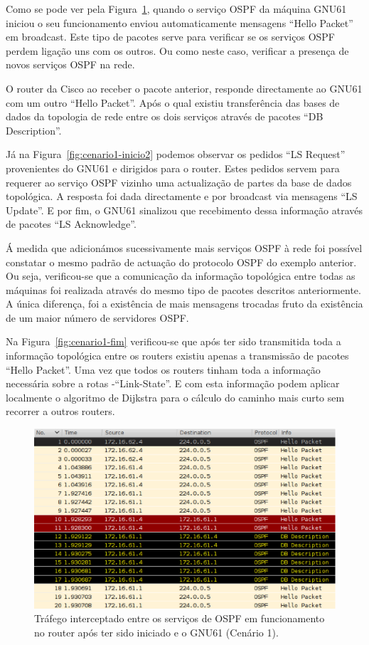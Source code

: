\documentclass[a4paper,12pt]{article}
\begin{document}
	Como se pode ver pela Figura~\ref{fig:cenario1-inicio1}, quando o serviço OSPF da máquina GNU61 iniciou o seu funcionamento enviou automaticamente mensagens ``Hello Packet'' em broadcast. Este tipo de pacotes serve para verificar se os serviços OSPF perdem ligação uns com os outros. Ou como neste caso, verificar a presença de novos serviços OSPF na rede. 

	O router da Cisco ao receber o pacote anterior, responde directamente ao GNU61 com um outro ``Hello Packet''. Após o qual existiu transferência das bases de dados da topologia de rede entre os dois serviços através de pacotes ``DB Description''.

	Já na Figura~\ref{fig:cenario1-inicio2} podemos observar os pedidos ``LS Request'' provenientes do GNU61 e dirigidos para o router. Estes pedidos servem para requerer ao serviço OSPF vizinho uma actualização de partes da base de dados topológica. A resposta foi dada directamente e por broadcast via mensagens ``LS Update''. E por fim, o GNU61 sinalizou que recebimento dessa informação através de pacotes ``LS Acknowledge''.

	Á medida que adicionámos sucessivamente mais serviços OSPF à rede foi possível constatar o mesmo padrão de actuação do protocolo OSPF do exemplo anterior. Ou seja, verificou-se que a comunicação da informação topológica entre todas as máquinas foi realizada através do mesmo tipo de pacotes descritos anteriormente. A única diferença, foi a existência de mais mensagens trocadas fruto da existência de um maior número de servidores OSPF.

	Na Figura~\ref{fig:cenario1-fim} verificou-se que após ter sido transmitida toda a informação topológica entre os routers existiu apenas a transmissão de pacotes ``Hello Packet''. Uma vez que todos os routers tinham toda a informação necessária sobre a rotas -``Link-State''. E com esta informação podem aplicar localmente o algoritmo de Dijkstra para o cálculo do caminho mais curto sem recorrer a outros routers.

\begin{figure}[htp]
	\begin{center}
		\includegraphics[width=6in]{cenario1-inicio1}
	\end{center}
	\caption{Tráfego interceptado entre os serviços de OSPF em funcionamento no router após ter sido iniciado e o GNU61 (Cenário 1).}
	\label{fig:cenario1-inicio1}
\end{figure}
\end{document}
